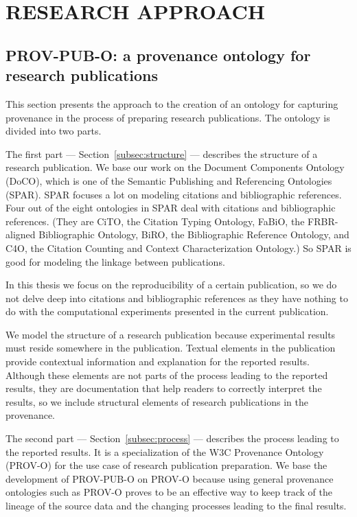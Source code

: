 \chapter{RESEARCH APPROACH}
\section{PROV-PUB-O: a provenance ontology for research publications}
This section presents the approach to the creation of an ontology for capturing provenance in the process of preparing research publications. The ontology is divided into two parts. 

The first part --- Section~\ref{subsec:structure} --- describes the structure of a research publication. We base our work on the Document Components Ontology (DoCO), which is one of the Semantic Publishing and Referencing Ontologies (SPAR). SPAR focuses a lot on modeling citations and bibliographic references. Four out of the eight ontologies in SPAR deal with citations and bibliographic references. (They are CiTO, the Citation Typing Ontology, FaBiO, the FRBR-aligned Bibliographic Ontology, BiRO, the Bibliographic Reference Ontology, and C4O, the Citation Counting and Context Characterization Ontology.) So SPAR is good for modeling the linkage between publications. 

In this thesis we focus on the reproducibility of a certain publication, so we do not delve deep into citations and bibliographic references as they have nothing to do with the computational experiments presented in the current publication. 

We model the structure of a research publication because experimental results must reside somewhere in the publication. Textual elements in the publication provide contextual information and explanation for the reported results. Although these elements are not parts of the process leading to the reported results, they are documentation that help readers to correctly interpret the results, so we include structural elements of research publications in the provenance.

The second part --- Section~\ref{subsec:process} --- describes the process leading to the reported results. It is a specialization of the W3C Provenance Ontology (PROV-O) for the use case of research publication preparation. We base the development of PROV-PUB-O on PROV-O because using general provenance ontologies such as PROV-O proves to be an effective way to keep track of the lineage of the source data and the changing processes leading to the final results. 

